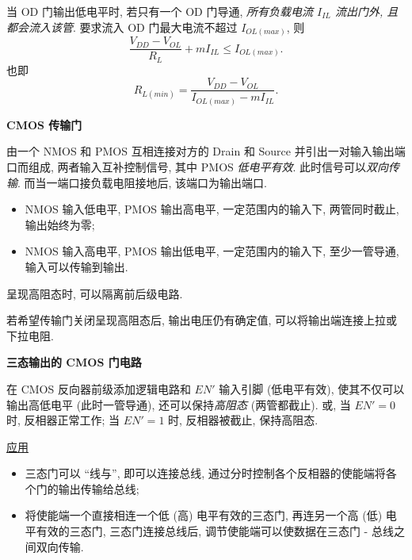 当 OD 门输出低电平时, 若只有一个 OD 门导通, \textit{所有负载电流 $I_{IL}$ 流出门外, 且都会流入该管}. 要求流入 OD 门最大电流不超过 $I_{OL(max)}$, 则
\begin{equation}
    \frac{V_{DD}-V_{OL}}{R_L}+mI_{IL}\leq I_{OL(max)}.
\end{equation}
也即
\begin{equation}
    R_{L(min)}=\frac{V_{DD}-V_{OL}}{I_{OL(max)}-mI_{IL}}.
\end{equation}

\textbf{CMOS 传输门}

由一个 NMOS 和 PMOS 互相连接对方的 Drain 和 Source 并引出一对输入输出端口而组成, 两者输入互补控制信号, 其中 PMOS \textit{低电平有效}. 此时信号可以\textit{双向传输}. 而当一端口接负载电阻接地后, 该端口为输出端口.

\begin{itemize}
    \item NMOS 输入低电平, PMOS 输出高电平, 一定范围内的输入下, 两管同时截止, 输出始终为零;
    \item NMOS 输入高电平, PMOS 输出低电平, 一定范围内的输入下, 至少一管导通, 输入可以传输到输出.
\end{itemize}

呈现高阻态时, 可以隔离前后级电路.

若希望传输门关闭呈现高阻态后, 输出电压仍有确定值, 可以将输出端连接上拉或下拉电阻.

\textbf{三态输出的 CMOS 门电路}

在 CMOS 反向器前级添加逻辑电路和 $EN'$ 输入引脚 (低电平有效), 使其不仅可以输出高低电平 (此时一管导通), 还可以保持\textit{高阻态} (两管都截止). 或, 当 $EN'=0$ 时, 反相器正常工作; 当 $EN'=1$ 时, 反相器被截止, 保持高阻态.

\underline{应用}
\begin{itemize}
    \item 三态门可以 ``线与'', 即可以连接总线, 通过分时控制各个反相器的使能端将各个门的输出传输给总线;
    \item 将使能端一个直接相连一个低 (高) 电平有效的三态门, 再连另一个高 (低) 电平有效的三态门, 三态门连接总线后, 调节使能端可以使数据在三态门 - 总线之间双向传输.
\end{itemize}
